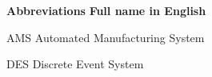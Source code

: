 \textbf{Abbreviations } \quad  \textbf{Full name in English}


AMS      \hspace{4.9em}   Automated Manufacturing System

DES      \hspace{5.2em}   Discrete Event System


